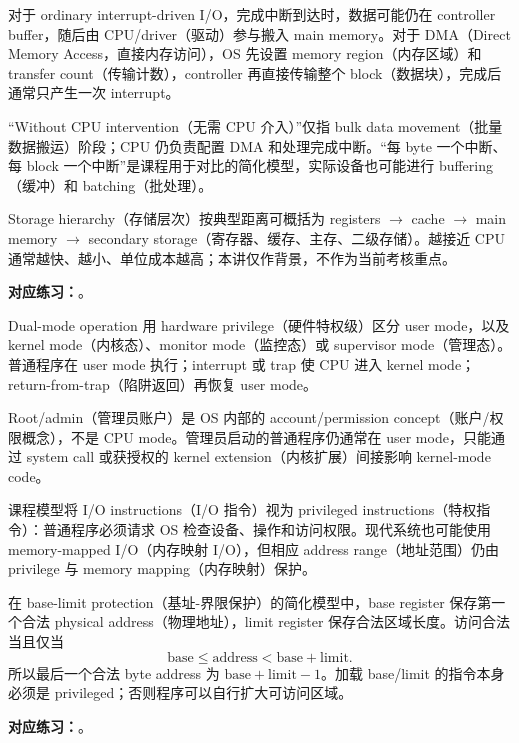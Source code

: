 对于 ordinary interrupt-driven I/O，完成中断到达时，数据可能仍在 controller buffer，随后由 CPU/driver（驱动）参与搬入 main memory。对于 DMA（Direct Memory Access，直接内存访问），OS 先设置 memory region（内存区域）和 transfer count（传输计数），controller 再直接传输整个 block（数据块），完成后通常只产生一次 interrupt。

“Without CPU intervention（无需 CPU 介入）”仅指 bulk data movement（批量数据搬运）阶段；CPU 仍负责配置 DMA 和处理完成中断。“每 byte 一个中断、每 block 一个中断”是课程用于对比的简化模型，实际设备也可能进行 buffering（缓冲）和 batching（批处理）。

Storage hierarchy（存储层次）按典型距离可概括为 registers $\rightarrow$ cache $\rightarrow$ main memory $\rightarrow$ secondary storage（寄存器、缓存、主存、二级存储）。越接近 CPU 通常越快、越小、单位成本越高；本讲仅作背景，不作为当前考核重点。

\textbf{对应练习：}。


Dual-mode operation 用 hardware privilege（硬件特权级）区分 user mode，以及 kernel mode（内核态）、monitor mode（监控态）或 supervisor mode（管理态）。普通程序在 user mode 执行；interrupt 或 trap 使 CPU 进入 kernel mode；return-from-trap（陷阱返回）再恢复 user mode。

Root/admin（管理员账户）是 OS 内部的 account/permission concept（账户/权限概念），不是 CPU mode。管理员启动的普通程序仍通常在 user mode，只能通过 system call 或获授权的 kernel extension（内核扩展）间接影响 kernel-mode code。

课程模型将 I/O instructions（I/O 指令）视为 privileged instructions（特权指令）：普通程序必须请求 OS 检查设备、操作和访问权限。现代系统也可能使用 memory-mapped I/O（内存映射 I/O），但相应 address range（地址范围）仍由 privilege 与 memory mapping（内存映射）保护。

在 base-limit protection（基址-界限保护）的简化模型中，base register 保存第一个合法 physical address（物理地址），limit register 保存合法区域长度。访问合法当且仅当
\[
  \boxed{\text{base}\leq \text{address}<\text{base}+\text{limit}}.
\]
所以最后一个合法 byte address 为 $\text{base}+\text{limit}-1$。加载 base/limit 的指令本身必须是 privileged；否则程序可以自行扩大可访问区域。

\textbf{对应练习：}。



